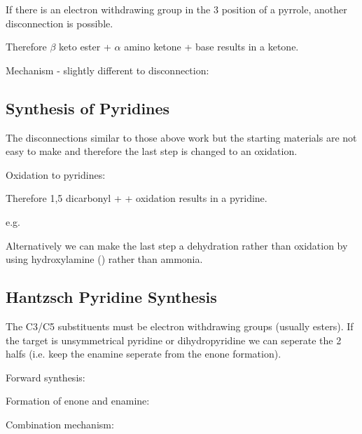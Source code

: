 If there is an electron withdrawing group in the 3 position of a pyrrole, another disconnection is possible.


Therefore $\beta$ keto ester + $\alpha$ amino ketone + base results in a ketone.


Mechanism - slightly different to disconnection:


\pagebreak

\subsection{Synthesis of Pyridines}

The disconnections similar to those above work but the starting materials are not easy to make and therefore the last step is changed to an oxidation.


Oxidation to pyridines:


Therefore 1,5 dicarbonyl +  + oxidation results in a pyridine.

e.g.


Alternatively we can make the last step a dehydration rather than oxidation by using hydroxylamine  () rather than ammonia.


\pagebreak

\subsection{Hantzsch Pyridine Synthesis}


The C3/C5 substituents must be electron withdrawing groups (usually esters).
If the target is unsymmetrical pyridine or dihydropyridine we can seperate the 2 halfs (i.e. keep the enamine seperate from the enone formation).


Forward synthesis:


Formation of enone and enamine:


Combination mechanism:

